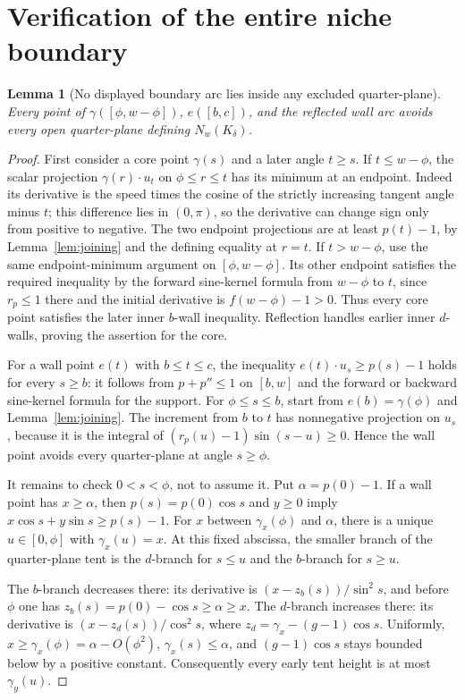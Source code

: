 \documentclass[11pt]{article}
\newtheorem{lemma}[theorem]{Lemma}
\begin{document}
\section{Verification of the entire niche boundary}
\begin{lemma}[No displayed boundary arc lies inside any excluded quarter-plane]\label{lem:boundary}
Every point of $\gamma([\phi,w-\phi])$, $e([b,c])$, and the reflected wall arc avoids every open quarter-plane defining $N_w(K_\delta)$.
\end{lemma}
\begin{proof}
First consider a core point $\gamma(s)$ and a later angle $t\ge s$. If $t\le w-\phi$, the scalar projection $\gamma(r)\cdot u_t$ on $\phi\le r\le t$ has its minimum at an endpoint. Indeed its derivative is the speed times the cosine of the strictly increasing tangent angle minus $t$; this difference lies in $(0,\pi)$, so the derivative can change sign only from positive to negative. The two endpoint projections are at least $p(t)-1$, by Lemma~\ref{lem:joining} and the defining equality at $r=t$. If $t>w-\phi$, use the same endpoint-minimum argument on $[\phi,w-\phi]$. Its other endpoint satisfies the required inequality by the forward sine-kernel formula from $w-\phi$ to $t$, since $r_p\le1$ there and the initial derivative is $f(w-\phi)-1>0$. Thus every core point satisfies the later inner $b$-wall inequality. Reflection handles earlier inner $d$-walls, proving the assertion for the core.

For a wall point $e(t)$ with $b\le t\le c$, the inequality $e(t)\cdot u_s\ge p(s)-1$ holds for every $s\ge b$: it follows from $p+p''\le1$ on $[b,w]$ and the forward or backward sine-kernel formula for the support. For $\phi\le s\le b$, start from $e(b)=\gamma(\phi)$ and Lemma~\ref{lem:joining}. The increment from $b$ to $t$ has nonnegative projection on $u_s$, because it is the integral of $(r_p(u)-1)\sin(s-u)\ge0$. Hence the wall point avoids every quarter-plane at angle $s\ge\phi$.

It remains to check $0<s<\phi$, not to assume it. Put $\alpha=p(0)-1$. If a wall point has $x\ge\alpha$, then $p(s)=p(0)\cos s$ and $y\ge0$ imply $x\cos s+y\sin s\ge p(s)-1$. For $x$ between $\gamma_x(\phi)$ and $\alpha$, there is a unique $u\in[0,\phi]$ with $\gamma_x(u)=x$. At this fixed abscissa, the smaller branch of the quarter-plane tent is the $d$-branch for $s\le u$ and the $b$-branch for $s\ge u$.

The $b$-branch decreases there: its derivative is $(x-z_b(s))/\sin^2s$, and before $\phi$ one has $z_b(s)=p(0)-\cos s\ge\alpha\ge x$. The $d$-branch increases there: its derivative is $(x-z_d(s))/\cos^2s$, where $z_d=\gamma_x-(g-1)\cos s$. Uniformly, $x\ge\gamma_x(\phi)=\alpha-O(\phi^2)$, $\gamma_x(s)\le\alpha$, and $(g-1)\cos s$ stays bounded below by a positive constant. Consequently every early tent height is at most $\gamma_y(u)$.


\end{proof}
\end{document}
